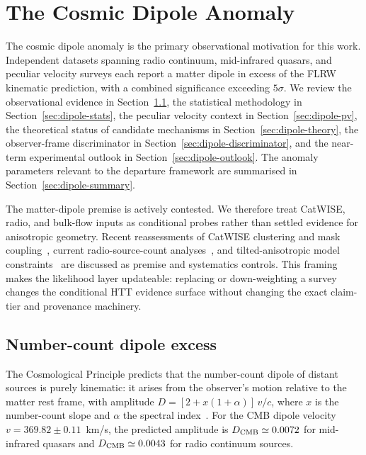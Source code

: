 
\chapter{The Cosmic Dipole Anomaly}
\label{ch:dipole}

The cosmic dipole anomaly is the primary observational
motivation for this work.  Independent datasets spanning
radio continuum, mid-infrared quasars, and peculiar velocity
surveys each report a matter dipole in excess of the FLRW
kinematic prediction, with a combined significance exceeding
$5\sigma$.  We review the observational evidence in
Section~\ref{sec:dipole-obs}, the statistical methodology in
Section~\ref{sec:dipole-stats}, the peculiar velocity context
in Section~\ref{sec:dipole-pv}, the theoretical status of
candidate mechanisms in Section~\ref{sec:dipole-theory}, the
observer-frame discriminator in
Section~\ref{sec:dipole-discriminator}, and the near-term
experimental outlook in
Section~\ref{sec:dipole-outlook}.  The anomaly parameters
relevant to the departure framework are summarised in
Section~\ref{sec:dipole-summary}.

The matter-dipole premise is actively contested.  We therefore treat
CatWISE, radio, and bulk-flow inputs as conditional probes rather than
settled evidence for anisotropic geometry.  Recent reassessments of
CatWISE clustering and mask coupling~\cite{Bashir2025,VonHausegger2025CatWISEClustering},
current radio-source-count analyses~\cite{Boehme2025}, and
tilted-anisotropic model constraints~\cite{Martin2025TiltedAnisotropicDipole}
are discussed as premise and systematics controls.  This framing makes
the likelihood layer updateable: replacing or down-weighting a survey
changes the conditional HTT evidence surface without changing the exact
claim-tier and provenance machinery.


\section{Number-count dipole excess}
\label{sec:dipole-obs}

The Cosmological Principle predicts that the number-count
dipole of distant sources is purely kinematic: it arises
from the observer's motion relative to the matter rest
frame, with amplitude $D = [2 + x(1 + \alpha)]\,v/c$,
where $x$ is the number-count slope and $\alpha$ the
spectral index~\cite{EllisBalwin1984}.  For the CMB dipole
velocity $v = 369.82 \pm 0.11$~km/s, the predicted
amplitude is $D_{\rm CMB} \simeq 0.0072$ for mid-infrared
quasars and $D_{\rm CMB} \simeq 0.0043$ for radio
continuum sources.

